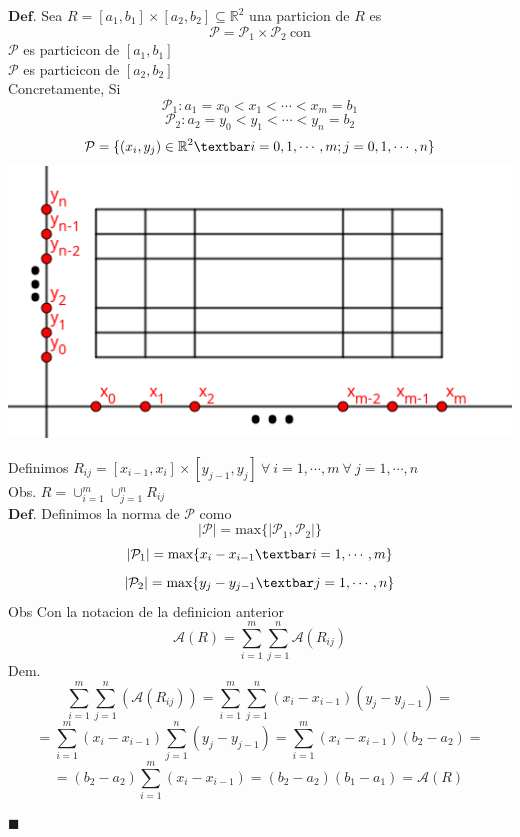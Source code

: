 \documentclass[10pt,a4paper]{article}
\providecommand{\abs}[1]{\lvert#1\rvert}
\begin{document}
\color{red} 
$\mathbf{Def.}$
\color{black} 
Sea $R= \left[ a_1 , b_1 \right] \times \left[ a_2,b_2 \right] \subseteq \mathbb{R}^2 $ una particion de $R$ es  
$$ \mathcal{P} = \mathcal{P}_1 \times \mathcal{P}_2 \ \text{con} $$
$ \mathcal{P}  $ es particicon de $[a_1,b_1]$ \\
$ \mathcal{P}  $ es particicon de $[a_2,b_2]$ \\
\newpage
Concretamente, Si 
$$ \mathcal{P}_1: a_1=x_0 < x_1 < \cdots < x_m = b_1 $$
$$ \mathcal{P}_2: a_2=y_0 < y_1 < \cdots < y_n = b_2$$
$$ \mathcal{P}= \{ \left( x_i , y_j \right) \in \mathbb{R} ^2 \textbar i=0,1,\cdots ,m ; j=0,1,\cdots ,n  \} $$
\centering
\includegraphics[scale=0.7]{figuras/img2 } \\
\raggedright
Definimos  
$R_{ij} = \left[ x_{i-1} , x_i \right] \times [y_{j-1}, y_j] \ \forall \ i=1,\cdots ,m \ \forall \ j=1, \cdots, n  $  \\ 
\color{red} Obs. \color{black} $ R = \cup_{i=1}^{m} \cup_{j=1}^{n}R_{ij} $ \\
\color{red} 
$\mathbf{Def.}$
\color{black} 
Definimos la norma de $\mathcal{P}$ como 
$$ \abs{  \mathcal{P} } = \text{max} \{ \abs{ \mathcal{P}_1 , \mathcal{P}_2 } \} $$
$$ \abs{\mathcal{P}_1} = \text{max} \{ x_i -x_{i-1} \textbar i=1,\cdots, m  \} $$
$$ \abs{\mathcal{P}_2} = \text{max} \{ y_j -y_{j-1} \textbar j=1,\cdots, n  \} $$
\color{red} Obs \color{black} Con la notacion de la definicion anterior 
$$ \mathcal{A} \left( R \right) = \sum_{i=1}^{m} \sum_{j=1}^{n} \mathcal{A} \left( R_{ij} \right)  $$
\color{red} Dem. \color{black} \\
$$ 
\sum_{i=1}^{m} \sum_{j=1}^{n} \left( \mathcal{A} \left( R_{ij} \right) \right) = 
\sum_{i=1}^{m} \sum_{j=1}^{n} \left( x_i - x_{i-1} \right) \left( y_j - y_{j-1} \right) =
$$
$$
= \sum_{i=1}^{m} \left( x_i-x_{i-1} \right)   \sum_{j=1}^{n}  \left( y_j - y_{j-1} \right) = 
\sum_{i=1}^{m} \left( x_i-x_{i-1} \right)  \left( b_2 -a_2 \right)  = 
$$
$$
= \left( b_2-a_2 \right)   \sum_{i=1}^{m} \left( x_i-x_{i-1} \right)  = 
 \left( b_2-a_2 \right)  \left( b_1-a_1 \right) =
 \mathcal{A} \left( R \right)  \ 
$$
\begin{flushright}
$\blacksquare$
\end{flushright}
\end{document}
